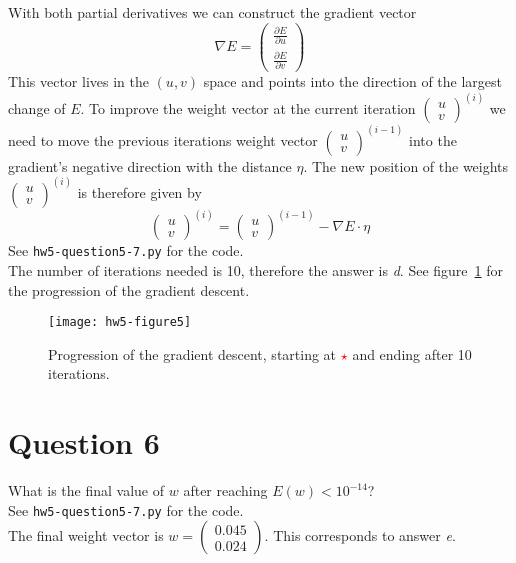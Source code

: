 \documentclass[	11pt,
				a4paper,
				twoside,
				titlepage,
				bibtotoc,
				openright,
				cleardoublepage=empty
				]{scrartcl}
\begin{document}
With both partial derivatives we can construct the gradient vector
\begin{equation}
\nabla E = \begin{pmatrix}\frac{\partial{E}}{\partial{u}}\\\frac{\partial{E}}{\partial{v}}\end{pmatrix}
\end{equation}
This vector lives in the $(u,v)$ space and points into the direction of the largest change of $E$.
To improve the weight vector at the current iteration $\left(\begin{smallmatrix}u\\v\end{smallmatrix}\right)^{(i)}$ we need to move the previous iterations weight vector $\left(\begin{smallmatrix}u\\v\end{smallmatrix}\right)^{(i-1)}$ into the gradient's negative direction with the distance $\eta$.
The new position of the weights $\left(\begin{smallmatrix}u\\v\end{smallmatrix}\right)^{(i)}$ is therefore given by
\begin{equation}
\left(\begin{smallmatrix}u\\v\end{smallmatrix}\right)^{(i)} = \left(\begin{smallmatrix}u\\v\end{smallmatrix}\right)^{(i-1)} - \nabla E \cdot \eta
\end{equation}
See \verb|hw5-question5-7.py| for the code.\\
The number of iterations needed is 10, therefore the answer is \emph{d}. See figure~\ref{fig:5} for the progression of the gradient descent.
\begin{figure}[!h]
	\texttt{[image: hw5-figure5]}
	\caption{Progression of the gradient descent, starting at \textcolor{red}{$\star$} and ending after 10 iterations.}
	\label{fig:5}
\end{figure}
\clearpage




\section{Question 6} %
What is the final value of $w$ after reaching $E(w) < 10^{-14}$?\\
See \verb|hw5-question5-7.py| for the code.\\
The final weight vector is $w = \left(\begin{smallmatrix}0.045\\0.024\end{smallmatrix}\right)$. This corresponds to answer \emph{e}.
\vspace{\baselineskip}
\end{document}
